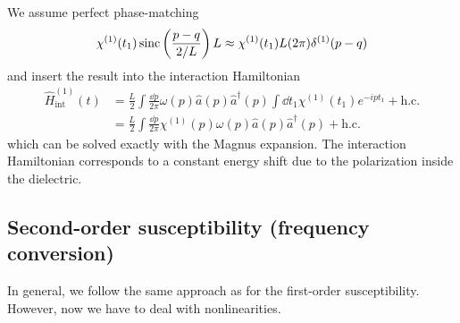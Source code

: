 We assume perfect phase-matching
\begin{equation}
	\chi^{(1)}(t_1)
	\operatorname{sinc}\left(\frac{p-q}{2/L}\right)
	L
	\approx
	\chi^{(1)}(t_1)L
	(2\pi)
	\delta^{(1)}(p-q)
\end{equation}
and insert the result into the interaction Hamiltonian
\begin{equation}
	\begin{split}
		\hat{H}_\text{int}^{(1)}(t)
		&=
		\frac{L}{2}
		\int\frac{\dd{p}}{2\pi}
		\omega(p)
		\hat{a}(p)
		\hat{a}^\dagger(p)
		\int\dd{t_1}
		\chi^{(1)}(t_1)
		e^{-ipt_1}
		+
		\text{h.c.}
		\\
		&=
		\frac{L}{2}
		\int\frac{\dd{p}}{2\pi}
		\chi^{(1)}(p)
		\omega(p)
		\hat{a}(p)
		\hat{a}^\dagger(p)
		+
		\text{h.c.}
	\end{split}
\end{equation}
which can be solved exactly with the Magnus expansion.
The interaction Hamiltonian corresponds to a constant energy shift due to the polarization inside the dielectric.

\subsection{Second-order susceptibility (frequency conversion)}\label{sec:frequency_convserion}

In general, we follow the same approach as for the first-order susceptibility.
However, now we have to deal with nonlinearities.


